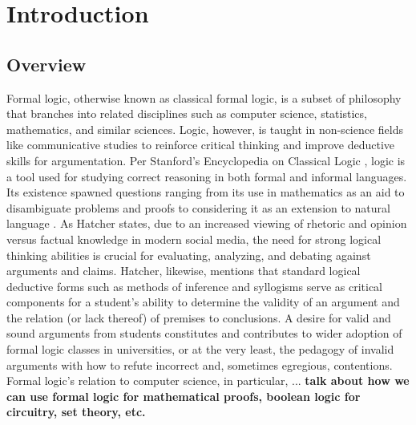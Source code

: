 \documentclass[ms]{uncgdissertationexp2}
\theoremstyle{plain}
\theoremstyle{definition}
\theoremstyle{remark}
\begin{document}
\tableofcontents 




\listoffigures   


\mainmatter %
\chapter{Introduction}
\section{Overview}
Formal logic, otherwise known as classical formal logic, is a subset of philosophy that branches into related disciplines such as computer science, statistics, mathematics, and similar sciences. Logic, however, is taught in non-science fields like communicative studies to reinforce critical thinking and improve deductive skills for argumentation. Per Stanford's Encyclopedia on Classical Logic \cite{stanfordencyclopedia}, logic is a tool used for studying correct reasoning in both formal and informal languages. Its existence spawned questions ranging from its use in mathematics as an aid to disambiguate problems and proofs to considering it as an extension to natural language \cite{stanfordencyclopedia}. As Hatcher \cite{hatcher} states, due to an increased viewing of rhetoric and opinion versus factual knowledge in modern social media, the need for strong logical thinking abilities is crucial for evaluating, analyzing, and debating against arguments and claims. Hatcher, likewise, mentions that standard logical deductive forms such as methods of inference and syllogisms serve as critical components for a student's ability to determine the validity of an argument and the relation (or lack thereof) of premises to conclusions. A desire for valid and sound arguments from students constitutes and contributes to wider adoption of formal logic classes in universities, or at the very least, the pedagogy of invalid arguments with how to refute incorrect and, sometimes egregious, contentions.  Formal logic's relation to computer science, in particular, ... \textbf{talk about how we can use formal logic for mathematical proofs, boolean logic for circuitry, set theory, etc.}
\end{document}
